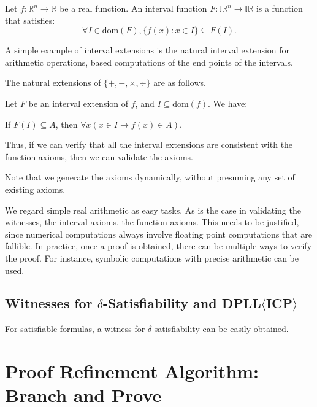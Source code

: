 \documentclass[envcountsect]{llncs}
\newcommand{\dom}{\mathrm{dom}}
\begin{document}
\begin{definition}
Let $f: \mathbb{R}^n\rightarrow \mathbb{R}$ be a real function. An interval
function $F: \mathbb{IR}^n \rightarrow \mathbb{IR}$ is a function that
satisfies:
$$\forall I\in \dom(F), \{f(x): x\in I\}\subseteq F(I).$$
\end{definition}

A simple example of interval extensions is the natural interval extension for
arithmetic operations, based computations of the end points of the intervals.
\begin{example}
The natural extensions of $\{+, -, \times, \div\}$ are as follows.
\end{example}

\begin{proposition}
Let $F$ be an interval extension of $f$, and $I\subseteq \dom(f)$. We have:
\begin{center}
If $F(I)\subseteq A$, then $\forall x (x\in I \rightarrow f(x)\in A)$.
\end{center}
\end{proposition}
Thus, if we can verify that all the interval extensions are consistent with the
function axioms, then we can validate the axioms.

\begin{remark}
Note that we generate the axioms dynamically, without presuming any set of
existing axioms.  
\end{remark}

\begin{remark}
We regard simple real arithmetic as easy tasks.
As is the case in validating the witnesses, the interval axioms, the function
axioms. This needs to be justified, since numerical computations always involve
floating point computations that are fallible. In practice, once a proof is
obtained, there can be multiple ways to verify the proof. For instance, symbolic
computations with precise arithmetic can be used.
\end{remark}


\subsection{Witnesses for $\delta$-Satisfiability and
DPLL$\langle$ICP$\rangle$}

For satisfiable formulas, a witness for $\delta$-satisfiability can be
easily obtained.


\section{Proof Refinement Algorithm: Branch and Prove}\label{bnp}
\end{document}
